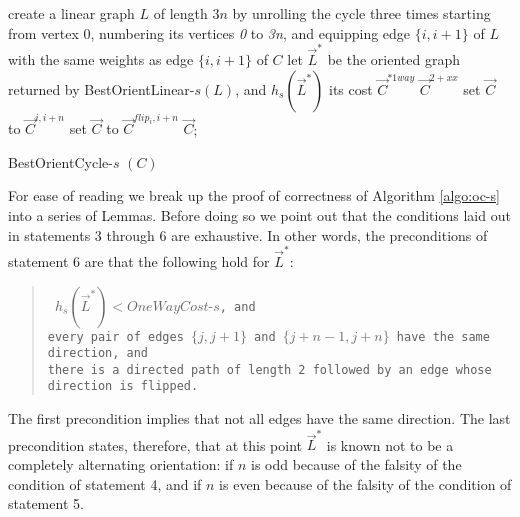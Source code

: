 \begin{algorithm}
	create a linear graph $L$ of 
	length $3n$ by unrolling the cycle three times starting from vertex $0$,
	numbering its vertices \textit{0} to \textit{3n}, and
	equipping edge $\{i,i+1\}$ of $L$ with the same weights as edge 
	$\{i ,i+1\}$ of $C$\;
	let $\vec{L}^*$ be the oriented graph returned by BestOrientLinear-$s(L)$, and $h_s(\vec{L}^*)$ its cost\;
	{\Return $\vec{C}^{*1way}$}
	{
	\Return  $\vec{C}^{2+xx}$
	}
	{set $\vec{C}$ to $\vec{C}^{i, i+n}$
	}
	\lElse
	{set $\vec{C}$ to $\vec{C}^{flip_i, i+n}$}
	\Return $\vec{C}$;
	\caption{BestOrientCycle-$s$ $(C)$}
	\label{algo:oc-s}
\end{algorithm}

\newpage For ease of reading we break up the proof of correctness of Algorithm \ref{algo:oc-s} into a series of Lemmas. Before doing so we point out that the conditions laid out in 
statements 3 through 6 are exhaustive. In other words, the preconditions of statement 6 are 
that the following hold for $\vec{L}^*$:
\begin{verse}
\texttt{
$h_s(\vec{L}^*) < \textit{OneWayCost-s}$, and \\
every pair of edges $\{j,j+1\}$ and $\{j+n-1,j+n\}$ have the same direction, and \\
there is a directed path of length 2 followed by an edge whose direction is flipped.}
\end{verse}
The first precondition implies that not all edges have the same direction. The last 
precondition states, therefore, that at this point $\vec{L}^*$ is known not to be a completely alternating
orientation: if $n$ is odd because of the falsity of the condition of statement 4, and 
if $n$ is even because of the falsity of the condition of statement 5.

